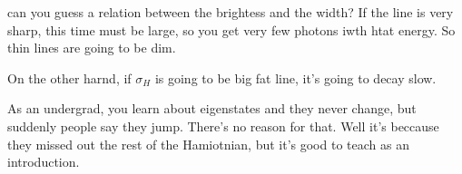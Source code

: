 can you guess a relation between the brightess and the width?
If the line is very sharp,
this time must be large,
so you get very few photons iwth htat energy.
So thin lines are going to be dim.

On the other harnd, if $\sigma_H$ is going to be big fat line,
it's going to decay slow.

As an undergrad,
you learn about eigenstates and they never change,
but suddenly people say they jump.
There's no reason for that.
Well it's beccause they missed out the rest of the Hamiotnian,
but it's good to teach as an introduction.
